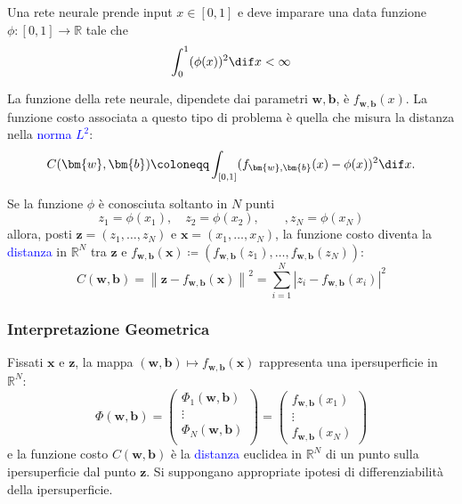 \documentclass[10pt]{book}
\newcommand{\1}{\mathds{1}}
\newcommand{\R}{\mathds{R}}
\newcommand{\norma}[1]{%
\left\lVert#1\right\rVert%
}
\theoremstyle{definition}%
\theoremstyle{plain}
\theoremstyle{remark}
\renewcommand{\href}[2]{\textcolor{blue}{#2}}
\begin{document}
Una rete neurale prende input \(x \in [0,1]\) e deve imparare una data funzione \(\phi:[0,1]\to \R\) tale che
\begin{equation*}
\int_{0}^{1}(\phi(x))^{2}\dif x <\infty
\end{equation*}

La funzione della rete neurale, dipendete dai parametri \(\bm{w},\bm{b}\), è \(f_{\bm{w},\bm{b}}(x)\). La funzione costo associata a questo tipo di problema è quella che misura la distanza nella \href{../../../../../org/roam/20250625123506-spazio_normato.org}{norma} \href{../../../../../org/roam/20250624162220-spazi_lp.org}{\(L^{2}\)}:
\begin{equation*}
C(\bm{w},\bm{b}) \coloneqq \int_{[0,1]} (f_{\bm{w},\bm{b}}(x)-\phi(x))^{2}\dif x.
\end{equation*}

Se la funzione \(\phi\) è conosciuta soltanto in \(N\) punti
\begin{equation*}
z_{1}=\phi(x_{1}),\quad z_{2}=\phi(x_{2}),\qquad, z_{N} = \phi(x_{N})
\end{equation*}
allora, posti \(\bm{z}=(z_{1},\dots,z_{N})\) e \(\bm{x} = (x_{1},\dots,x_{N})\), la funzione costo diventa la \href{../../../../../org/roam/20250301193511-spazio_metrico.org}{distanza} in \(\R^{N}\) tra \(\bm{z}\) e \(f_{\bm{w},\bm{b}}(\bm{x}) \coloneqq \left(f_{\bm{w},\bm{b}}(z_{1}),\dots,f_{\bm{w},\bm{b}}(z_{N})\right)\):
\begin{equation*}
C(\bm{w},\bm{b}) = \norma{\bm{z}-f_{\bm{w},\bm{b}}(\bm{x})}^{2} = \sum_{i=1}^{N} |z_{i}-f_{\bm{w},\bm{b}}(x_{i})|^{2}
\end{equation*}
\subsubsection{Interpretazione Geometrica}
\label{sec:org75f4bbb}

Fissati \(\bm{x}\) e \(\bm{z}\), la mappa \((\bm{w},\bm{b})\mapsto f_{\bm{w},\bm{b}}(\bm{x})\) rappresenta una ipersuperficie in \(\R^{N}\):
\begin{equation*}
\Phi(\bm{w},\bm{b}) = \begin{pmatrix}
\Phi_{1}(\bm{w},\bm{b})\\
\vdots\\
\Phi_{N}(\bm{w},\bm{b})\\
\end{pmatrix} = \begin{pmatrix}
f_{\bm{w},\bm{b}}(x_{1})\\
\vdots\\
f_{\bm{w},\bm{b}}(x_{N})
\end{pmatrix}
\end{equation*}
e la funzione costo \(C(\bm{w},\bm{b})\) è la \href{../../../../../org/roam/20250301193511-spazio_metrico.org}{distanza} euclidea in \(\R^{N}\) di un punto sulla ipersuperficie dal punto \(\bm{z}\). Si suppongano appropriate ipotesi di differenziabilità della ipersuperficie.
\end{document}
